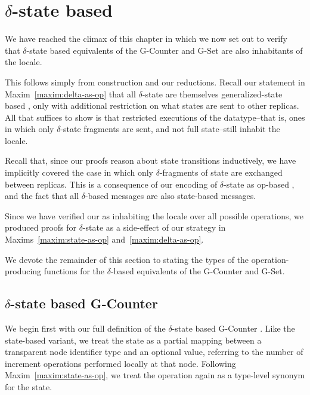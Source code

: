 \section{$\delta$-state based \CRDTs}
\label{sec:isabelle-delta-crdts}

We have reached the climax of this chapter in which we now set out to verify
that $\delta$-state based \CRDT equivalents of the G-Counter and G-Set are also
inhabitants of the \SEC locale.

This follows simply from construction and our reductions. Recall our statement
in Maxim~\ref{maxim:delta-as-op} that all $\delta$-state \CRDTs are
themselves generalized-state based \CRDTs, only with additional restriction on
what states are sent to other replicas. All that suffices to show is that
restricted executions of the datatype--that is, ones in which only
$\delta$-state fragments are sent, and not full state--still inhabit the \SEC
locale.

Recall that, since our proofs reason about state transitions inductively, we
have implicitly covered the case in which only $\delta$-fragments of state are
exchanged between replicas. This is a consequence of our encoding of
$\delta$-state \CRDTs as op-based \CRDTs, and the fact that all $\delta$-based
\CRDT messages are also state-based \CRDT messages.

Since we have verified our \CRDTs as inhabiting the \SEC locale over all
possible operations, we produced proofs for $\delta$-state \CRDTs as a
side-effect of our strategy in Maxims~\ref{maxim:state-as-op}
and~\ref{maxim:delta-as-op}.

We devote the remainder of this section to stating the types of the
operation-producing functions for the $\delta$-based \CRDT equivalents of the
G-Counter and G-Set.

\subsection{$\delta$-state based G-Counter}
\label{sec:isabelle-delta-gcounter}

We begin first with our full definition of the $\delta$-state based G-Counter
\CRDT. Like the state-based variant, we treat the state as a partial mapping
between a transparent node identifier type and an optional value, referring to
the number of increment operations performed locally at that node. Following
Maxim~\ref{maxim:state-as-op}, we treat the operation again as a type-level
synonym for the state.

